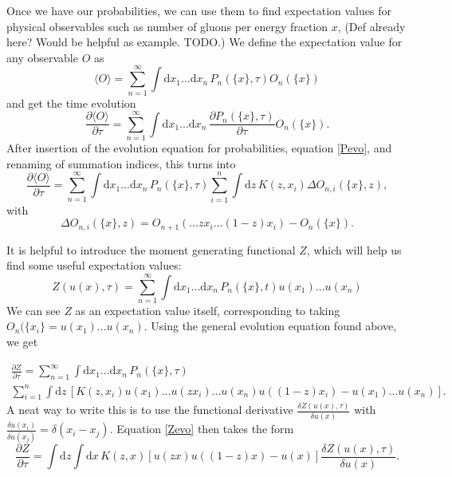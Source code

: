 \documentclass[a4paper,12pt]{article}
\newcommand{\party}[2]{\frac{\partial{#1}}{\partial{#2}}}
\numberwithin{equation}{section}
\begin{document}
Once we have our probabilities, we can use them to find expectation values for physical observables such as number of gluons per energy fraction $x$, (Def already here? Would be helpful as example. TODO.)
We define the expectation value for any observable $O$ as
\begin{equation}
\langle O \rangle = \sum_{n=1}^\infty \int \mathrm{d}x_1...\mathrm{d}x_n \, P_n(\{x\},\tau) O_n(\{x\})
\end{equation}
and get the time evolution 
\begin{equation}
\party{\langle O \rangle}{\tau}=\sum_{n=1}^\infty \int \mathrm{d}x_1...\mathrm{d}x_n \, \party{P_n(\{x\},\tau)}{\tau} O_n(\{x\}).
\end{equation}
%
After insertion of the evolution equation for probabilities, equation \eqref{Pevo}, and renaming of summation indices, this turns into
%
\begin{equation}
\party{\langle O \rangle}{\tau}=\sum_{n=1}^\infty \int \mathrm{d}x_1...\mathrm{d}x_n\, P_n(\{x\},\tau) \sum_{i=1}^n \int \mathrm{d}z\, K(z,x_i) \Delta O_{n,i}(\{x\},z),
\end{equation}
with
\begin{equation}
\Delta O_{n,i}(\{x\},z)=O_{n+1}(...zx_i...(1-z)x_i)-O_n(\{x\}).
\end{equation}


It is helpful to introduce the moment generating functional $Z$, which will help us find some useful expectation values:
\begin{equation}
Z(u(x),\tau)=\sum_{n=1}^\infty \int \mathrm{d}x_1...\mathrm{d}x_n\, P_n(\{x\},t) u(x_1)...u(x_n)
\end{equation}
We can see $Z$ as an expectation value itself, corresponding to taking $O_n(\{x_i\}=u(x_1)...u(x_n)$. Using the general evolution equation found above, we get

\begin{multline}\label{Zevo}
\party{Z}{\tau}=\sum_{n=1}^\infty \int \mathrm{d}x_1...\mathrm{d}x_n\, P_n(\{x\},\tau)\\
 \sum_{i=1}^n \int \mathrm{d}z\, [ K(z,x_i)
u(x_1)...u(zx_i)...u(x_n)u((1-z)x_i) 
- u(x_1)...u(x_n) ].
\end{multline}
A neat way to write this is to use the functional derivative $\frac{\delta Z(u(x),\tau)}{\delta u(x)}$ with $\frac{\delta u(x_i)}{\delta u(x_j)}=\delta(x_i-x_j)$. Equation \eqref{Zevo} then takes the form
\begin{equation}
\party{Z}{\tau}=\int \mathrm{d}z \int \mathrm{d}x \, K(z,x) [u(zx)u((1-z)x) - u(x)]\frac{\delta Z(u(x),\tau)}{\delta u(x)}.
\end{equation}
\end{document}
